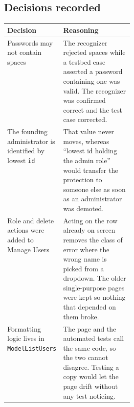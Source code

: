 \documentclass[11pt,a4paper]{article}
\newcommand{\cls}[1]{\texttt{#1}}
\begin{document}
\subsection{Decisions recorded}

\begin{center}
\begin{tabularx}{\linewidth}{@{}p{0.30\linewidth}X@{}}
\toprule
\textbf{Decision} & \textbf{Reasoning} \\
\midrule
Passwords may not contain spaces &
The recognizer rejected spaces while a testbed case asserted a password containing one was
valid. The recognizer was confirmed correct and the test case corrected. \\
\addlinespace
The founding administrator is identified by lowest \texttt{id} &
That value never moves, whereas ``lowest id holding the admin role'' would transfer the
protection to someone else as soon as an administrator was demoted. \\
\addlinespace
Role and delete actions were added to Manage Users &
Acting on the row already on screen removes the class of error where the wrong name is
picked from a dropdown. The older single-purpose pages were kept so nothing that depended on
them broke. \\
\addlinespace
Formatting logic lives in \cls{ModelListUsers} &
The page and the automated tests call the same code, so the two cannot disagree. Testing a
copy would let the page drift without any test noticing. \\
\bottomrule
\end{tabularx}
\end{center}
\end{document}
